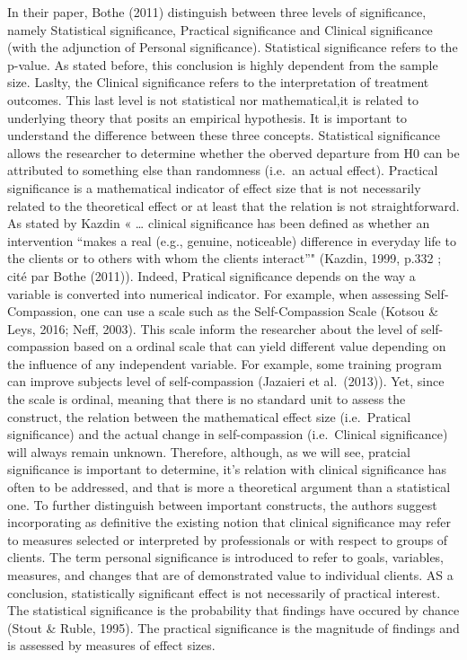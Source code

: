 \documentclass[man]{apa6}
\begin{document}
In their paper, Bothe (2011) distinguish between three levels of signiﬁcance, namely Statistical signiﬁcance, Practical signiﬁcance and Clinical signiﬁcance (with the adjunction of Personal signiﬁcance). Statistical signiﬁcance refers to the p-value. As stated before, this conclusion is highly dependent from the sample size. Laslty, the Clinical signiﬁcance refers to the interpretation of treatment outcomes. This last level is not statistical nor mathematical,it is related to underlying theory that posits an empirical hypothesis.
It is important to understand the diﬀerence between these three concepts. Statistical signiﬁcance allows the researcher to determine whether the oberved departure from H0 can be attributed to something else than randomness (i.e.~an actual eﬀect). Practical signiﬁcance is a mathematical indicator of eﬀect size that is not necessarily related to the theoretical eﬀect or at least that the relation is not straightforward. As stated by Kazdin « \ldots{} clinical signiﬁcance has been deﬁned as whether an intervention \enquote{makes a real (e.g., genuine, noticeable) diﬀerence in everyday life to the clients or to others with whom the clients interact}" (Kazdin, 1999, p.332 ; cité par Bothe (2011)). Indeed, Pratical signiﬁcance depends on the way a variable is converted into numerical indicator. For example, when assessing Self-Compassion, one can use a scale such as the Self-Compassion Scale (Kotsou \& Leys, 2016; Neﬀ, 2003). This scale inform the researcher about the level of self-compassion based on a ordinal scale that can yield diﬀerent value depending on the inﬂuence of any independent variable. For example, some training program can improve subjects level of self-compassion (Jazaieri et al.~(2013)). Yet, since the scale is ordinal, meaning that there is no standard unit to assess the construct, the relation between the mathematical eﬀect size (i.e.~Pratical signiﬁcance) and the actual change in self-compassion (i.e.~Clinical signiﬁcance) will always remain unknown. Therefore, although, as we will see, pratcial signiﬁcance is important to determine, it's relation with clinical signiﬁcance has often to be addressed, and that is more a theoretical argument than a statistical one.
To further distinguish between important constructs, the authors suggest incorporating as deﬁnitive the existing notion that clinical signiﬁcance may refer to measures selected or interpreted by professionals or with respect to groups of clients. The term personal signiﬁcance is introduced to refer to goals, variables, measures, and changes that are of demonstrated value to individual clients.
AS a conclusion, statistically signiﬁcant eﬀect is not necessarily of practical interest. The statistical signiﬁcance is the probability that ﬁndings have occured by chance (Stout \& Ruble, 1995). The practical signiﬁcance is the magnitude of ﬁndings and is assessed by measures of eﬀect sizes.
\end{document}
